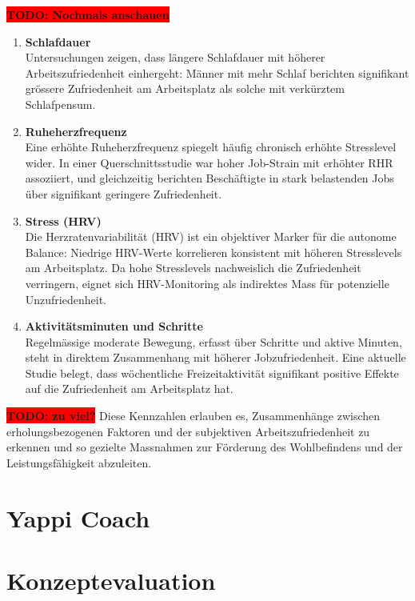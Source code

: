 \documentclass[12pt,a4paper]{report}
\newcommand{\todo}[1]{\colorbox{red}{\textbf{TODO: #1}}}
\begin{document}
\todo{Nochmals anschauen}
\begin{enumerate}
	\item \textbf{Schlafdauer}\\
	      Untersuchungen zeigen, dass längere Schlafdauer mit höherer Arbeitszufriedenheit einhergeht:
	      Männer mit mehr Schlaf berichten signifikant grössere Zufriedenheit am Arbeitsplatz als
	      solche mit verkürztem Schlafpensum.

	\item \textbf{Ruheherzfrequenz}\\
	      Eine erhöhte Ruheherzfrequenz spiegelt häufig chronisch erhöhte Stresslevel wider. In einer
	      Querschnittsstudie war hoher Job-Strain mit erhöhter RHR assoziiert, und gleichzeitig berichten
	      Beschäftigte in stark belastenden Jobs über signifikant geringere Zufriedenheit.

	\item \textbf{Stress (HRV)}\\
	      Die Herzratenvariabilität (HRV) ist ein objektiver Marker für die autonome Balance: Niedrige
	      HRV-Werte korrelieren konsistent mit höheren Stresslevels am Arbeitsplatz. Da hohe Stresslevels
	      nachweislich die Zufriedenheit verringern, eignet sich HRV-Monitoring als indirektes Mass für
	      potenzielle Unzufriedenheit.

	\item \textbf{Aktivitätsminuten und Schritte}\\
	      Regelmässige moderate Bewegung, erfasst über Schritte und aktive Minuten, steht in direktem
	      Zusammenhang mit höherer Jobzufriedenheit. Eine aktuelle Studie belegt, dass wöchentliche
	      Freizeitaktivität signifikant positive Effekte auf die Zufriedenheit am Arbeitsplatz hat.
\end{enumerate}

\todo{zu viel?}
Diese Kennzahlen erlauben es, Zusammenhänge zwischen erholungsbezogenen Faktoren und der subjektiven
Arbeitszufriedenheit zu erkennen und so gezielte Massnahmen zur Förderung des Wohlbefindens und der
Leistungsfähigkeit abzuleiten.

\section{Yappi Coach}
\section{Konzeptevaluation}
\end{document}
